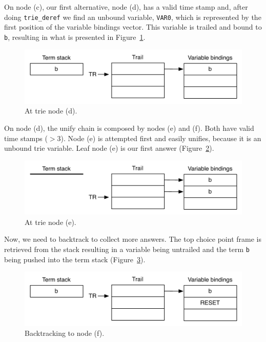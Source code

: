 On node (c), our first alternative, node (d), has a valid time stamp and, after doing
\texttt{trie\_deref} we find an unbound variable, \texttt{VAR0}, which is represented
by the first position of the variable bindings vector.
This variable is trailed and bound to \texttt{b},
resulting in what is presented in Figure~\ref{fig:collect_ex2}.

\begin{figure}[H]
  \centering
    \includegraphics[scale=0.5]{collect_ex2.pdf}
  \caption{At trie node (d).}
  \label{fig:collect_ex2}
\end{figure}

On node (d), the unify chain is composed by nodes (e) and (f). Both have valid time stamps ($> 3$).
Node (e) is attempted first and easily unifies, because it is an unbound trie variable.
Leaf node (e) is our first answer (Figure~\ref{fig:collect_ex3}).

\begin{figure}[H]
  \centering
    \includegraphics[scale=0.5]{collect_ex3.pdf}
  \caption{At trie node (e).}
  \label{fig:collect_ex3}
\end{figure}

Now, we need to backtrack to collect more answers. The top choice point frame is retrieved from the stack resulting in a variable being untrailed and the term \texttt{b} being pushed into the term stack (Figure~\ref{fig:collect_ex4}).

\begin{figure}[H]
  \centering
    \includegraphics[scale=0.5]{collect_ex4.pdf}
  \caption{Backtracking to node (f).}
  \label{fig:collect_ex4}
\end{figure}

